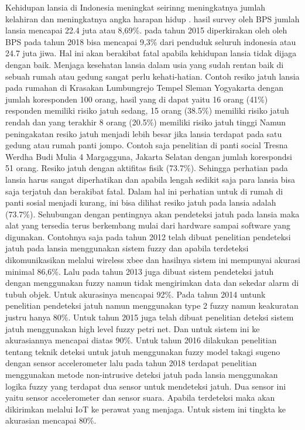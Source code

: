 \documentclass[11pt]{article}
\begin{document}
	Kehidupan lansia di Indonesia meningkat seirinng meningkatnya jumlah kelahiran dan meningkatnya angka harapan hidup .
	hasil survey oleh  BPS  jumlah lansia mencapai 22.4 juta atau  8,69\%. pada tahun 2015\cite{Kesehatan}
	diperkirakan oleh oleh BPS pada tahun 2018 bisa mencapai 9,3\% dari penduduk seluruh indonesia atau 24.7 juta jiwa.
	Hal ini akan berakibat fatal apabila kehidupan lansia tidak dijaga dengan baik.
	Menjaga kesehatan lansia dalam usia yang sudah rentan baik di sebuah rumah atau gedung sangat perlu kehati-hatian.
	Contoh resiko jatuh lansia pada rumahan di Krasakan Lumbungrejo Tempel Sleman Yogyakarta dengan jumlah koresponden 100 orang, hasil yang di dapat  yaitu 16 orang (41\%) responden memiliki risiko jatuh sedang, 15 orang (38.5\%) memiliki risiko jatuh rendah
	dan yang terakhir 8 orang (20.5\%) memiliki risiko jatuh tinggi \cite{Utami2017a}
	Namun peningakatan resiko jatuh menjadi lebih besar jika lansia terdapat pada satu gedung atau rumah panti jompo.
	Contoh saja penelitian di panti social Tresna Werdha Budi Mulia 4 Margagguna, Jakarta Selatan dengan jumlah korespondsi 51 orang.
	Resiko jatuh dengan aktifitas fisik (73.7\%).
	Sehingga perhatian pada lansia harus sangat diperhatikan dan apabila lengah sedikit saja para lansia bisa saja terjatuh dan berakibat fatal.
	Dalam hal ini perhatian untuk di rumah di panti sosial menjadi kurang, ini bisa dilihat resiko jatuh pada lansia adalah (73.7\%).
	Sehubungan dengan pentingnya akan pendeteksi jatuh pada lansia maka alat yang tersedia terus berkembang mulai dari hardware sampai software yang digunakan.
	Contohnya saja pada tahun 2012 telah dibuat penelitian pendeteksi jatuh pada lansia menggunakan sistem fuzzy dan apabila terdeteksi dikomunikasikan melalui wireless xbee dan hasilnya sistem ini mempunyai akurasi minimal 86,6\%.
	Lalu pada tahun 2013 juga dibuat sistem pendeteksi jatuh dengan menggunakan fuzzy namun tidak mengirimkan data dan sekedar alarm di tubuh objek.
	Untuk akurasinya mencapai 92\%.
	Pada tahun 2014 untunk penelitian pendeteksi jatuh namun menggunakan type 2 fuzzy namun keakuratan justru hanya 80\%.
	Untuk tahun 2015 juga telah dibuat penelitian deteksi sistem jatuh menggunakan high level fuzzy petri net.
	Dan untuk sistem ini ke akurasiannya mencapai diatas 90\%.
	Untuk tahun 2016 dilakukan penelitian tentang teknik deteksi untuk jatuh menggunakan fuzzy model takagi sugeno dengan sensor accelerometer lalu pada tahun 2018 terdapat penelitian menggunakan metode non-intrusive deteksi jatuh pada lansia menggunakan logika fuzzy yang terdapat dua sensor untuk mendeteksi jatuh.
	Dua sensor ini yaitu sensor accelerometer dan sensor suara.
	Apabila terdeteksi maka akan dikirimkan melalui IoT ke perawat yang menjaga. Untuk sistem ini tingkta ke akurasian mencapai 80\%.
\end{document}
